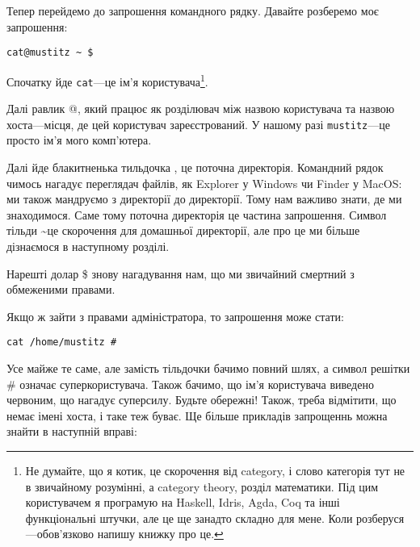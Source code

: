 Тепер перейдемо до запрошення командного рядку. 
Давайте розберемо моє запрошення:

\texttt{\textcolor{termuser}{cat@mustitz}~\textcolor{termdir}{\textasciitilde~\$}}

Спочатку йде \texttt{cat}---це ім'я користувача\footnote{
Не думайте, що я котик, це скорочення від category,
і слово категорія тут не в звичайному розумінні,
а category theory, розділ математики.
Під цим користувачем я програмую на Haskell, Idris, Agda, Coq
та інші функціональні штучки, але це ще занадто складно для мене.
Коли розберуся---обов'язково напишу книжку про це.
}.

Далі равлик \chr @, який працює як розділювач між назвою користувача
та назвою хоста---місця, де цей користувач зареєстрований.
У нашому разі \texttt{mustitz}---це просто ім'я мого комп'ютера.

Далі йде блакитненька тильдочка \file{\textasciitilde}, це поточна директорія.
Командний рядок чимось нагадує переглядач файлів, як Explorer у Windows чи Finder у MacOS:
ми також мандруємо з директорії до директорії.
Тому нам важливо знати, де ми знаходимося.
Саме тому поточна директорія це частина запрошення.
Символ тільди \chr\textasciitilde це скорочення для домашньої директорії,
але про це ми більше дізнаємося в наступному розділі.

Нарешті долар \chr\$ знову нагадування нам,
що ми звичайний смертний з обмеженими правами.

Якщо ж зайти з правами адміністратора, то запрошення може стати:

\texttt{\textcolor{termroot}{cat}~\textcolor{termdir}{/home/mustitz \#}}

Усе майже те саме, але замість тільдочки бачимо повний шлях,
а символ решітки \chr\# означає суперкористувача.
Також бачимо, що ім'я користувача виведено червоним, що нагадує суперсилу.
Будьте обережні!
Також, треба відмітити, що немає імені хоста, і таке теж буває.
Ще більше прикладів запрощеннь можна знайти в наступній вправі:

